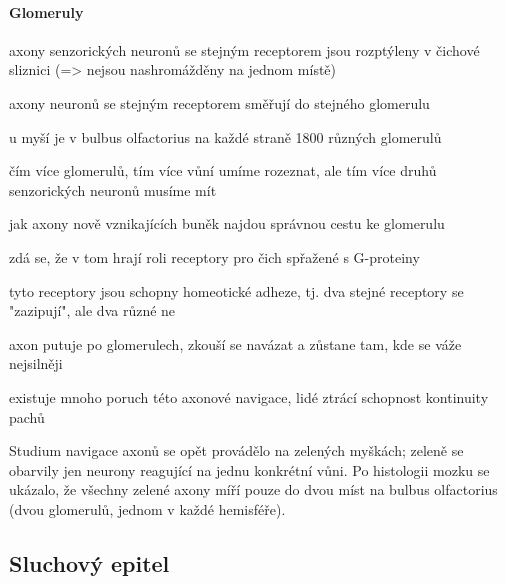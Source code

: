 \documentclass[DIV=8]{scrreprt}
\begin{document}
\paragraph{Glomeru­ly}
\begin{myItemize}[nosep]
    \item axony senzorických neuronů se stejným receptorem jsou rozptýleny v čichové sliznici (=> nejsou nashromážděny na jednom místě)
    \item axony neuronů se stejným receptorem směřují do stejného glomerulu
\begin{myItemize}[nosep]
    \item u myší je v bulbus olfactorius na každé straně 1800 různých glomerulů
    \item čím více glomerulů, tím více vůní umíme rozeznat, ale tím více druhů senzorických neuronů musíme mít
\end{myItemize}

    \item jak axony nově vznikajících buněk najdou správnou cestu ke glomerulu
\begin{myItemize}[nosep]
    \item zdá se, že v tom hrají roli receptory pro čich spřažené s G-proteiny
    \item tyto receptory jsou schopny homeotické adheze, tj. dva stejné receptory se "zazipují", ale dva různé ne
    \item axon putuje po glomerulech, zkouší se navázat a zůstane tam, kde se váže nejsilněji
\end{myItemize}

    \item existuje mnoho poruch této axonové navigace, lidé ztrácí schopnost kontinuity pachů
\end{myItemize}



Studium navigace axonů se opět provádělo na zelených myškách; zeleně se obarvily jen neurony reagující na jednu konkrétní vůni. Po histologii mozku se ukázalo, že všechny zelené axony míří pouze do dvou míst na bul­bus ol­fac­to­rius (dvou glomerulů, jednom v každé hemisféře).

\subsection{Sluchový epitel} \label{Sluchový epitel}
\end{document}
